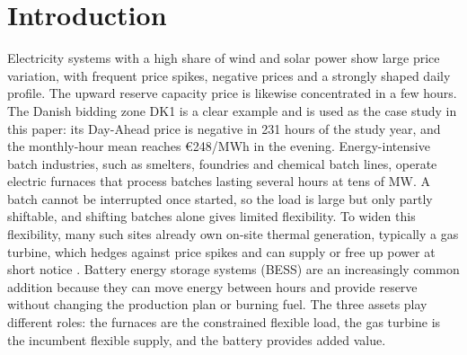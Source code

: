 \documentclass[5p,times,twocolumn]{elsarticle}
\begin{document}
\section{Introduction}
Electricity systems with a high share of wind and solar power show large price variation, with frequent price spikes, negative prices and a strongly shaped daily profile. The upward reserve capacity price is likewise concentrated in a few hours. The Danish bidding zone DK1 is a clear example and is used as the case study in this paper: its Day-Ahead price is negative in 231 hours of the study year, and the monthly-hour mean reaches €248/MWh in the evening. Energy-intensive batch industries, such as smelters, foundries and chemical batch lines, operate electric furnaces that process batches lasting several hours at tens of MW. A batch cannot be interrupted once started, so the load is large but only partly shiftable, and shifting batches alone gives limited flexibility. To widen this flexibility, many such sites already own on-site thermal generation, typically a gas turbine, which hedges against price spikes and can supply or free up power at short notice \cite{Tan2019,Hadera2015}. Battery energy storage systems (BESS) are an increasingly common addition because they can move energy between hours and provide reserve without changing the production plan or burning fuel\cite{GwenaelleDeboutte,Shakrina2023}. The three assets play different roles: the furnaces are the constrained flexible load, the gas turbine is the incumbent flexible supply, and the battery provides added value. 
\end{document}
